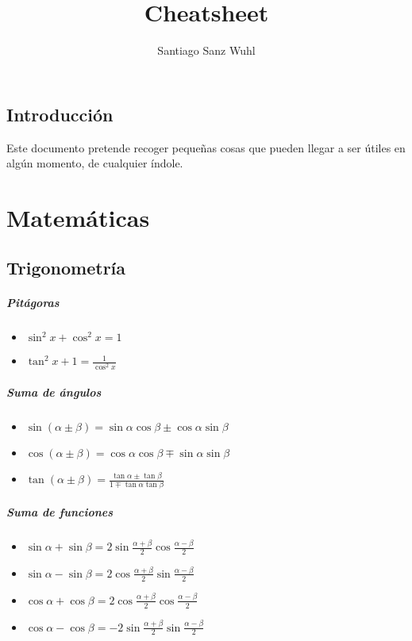 \documentclass[a4paper]{book}
\author{Santiago Sanz Wuhl}
\title{Cheatsheet}
\begin{document}
\maketitle

\tableofcontents

\section*{Introducción}
Este documento pretende recoger pequeñas cosas que pueden llegar a ser útiles en algún momento, de cualquier índole.

\chapter{Matemáticas}
\section{Trigonometría}
\paragraph{Pitágoras}
\begin{itemize}
	\item $\sin^2 x + \cos^2x = 1$ 
	\item $\tan^2x + 1 = \frac{1}{\cos^2x}$ 
\end{itemize}

\paragraph{Suma de ángulos}
\begin{itemize}
	\item $\sin\left( \alpha \pm \beta \right) = \sin\alpha \cos\beta \pm \cos\alpha \sin\beta$
	\item $\cos(\alpha \pm \beta) = \cos\alpha \cos\beta \mp \sin\alpha \sin\beta$
	\item $\tan\left( \alpha \pm \beta \right) = \frac{\tan \alpha \pm \tan \beta}{1 \mp \tan \alpha \tan \beta}$
\end{itemize}

\paragraph{Suma de funciones}
\begin{itemize}
	\item $\sin\alpha + \sin\beta = 2\sin\frac{\alpha + \beta}{2} \cos \frac{\alpha -\beta}{2}$
	\item $\sin\alpha - \sin\beta = 2\cos\frac{\alpha + \beta}{2} \sin\frac{\alpha -\beta}{2}$
	\item $\cos\alpha + \cos\beta = 2\cos\frac{\alpha + \beta}{2} \cos \frac{\alpha -\beta}{2}$
	\item $\cos\alpha - \cos\beta =- 2\sin\frac{\alpha + \beta}{2} \sin \frac{\alpha -\beta}{2}$
\end{itemize}
\end{document}
